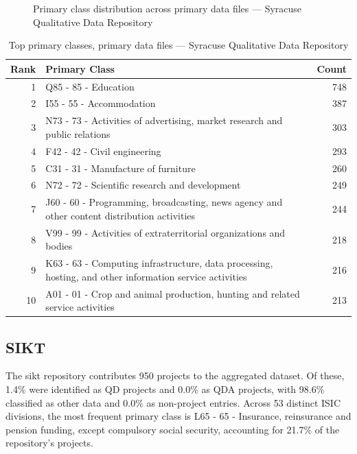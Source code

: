 \clearpage

\begin{figure}[H]
    \centering
    
    \caption{Primary class distribution across primary data files --- Syracuse Qualitative Data Repository}
\end{figure}

\begin{table}[H]
    \centering
    \begin{tabular}{r p{10cm} r}
    \hline
    \textbf{Rank} & \textbf{Primary Class} & \textbf{Count} \\
    \hline
    1 & Q85 - 85 - Education & 748 \\
    2 & I55 - 55 - Accommodation & 387 \\
    3 & N73 - 73 - Activities of advertising, market research and public relations & 303 \\
    4 & F42 - 42 - Civil engineering & 293 \\
    5 & C31 - 31 - Manufacture of furniture & 260 \\
    6 & N72 - 72 - Scientific research and development & 249 \\
    7 & J60 - 60 - Programming, broadcasting, news agency and other content distribution activities & 244 \\
    8 & V99 - 99 - Activities of extraterritorial organizations and bodies & 218 \\
    9 & K63 - 63 - Computing infrastructure, data processing, hosting, and other information service activities & 216 \\
    10 & A01 - 01 - Crop and animal production, hunting and related service activities & 213 \\
    \hline
    \end{tabular}
    \caption{Top primary classes, primary data files --- Syracuse Qualitative Data Repository}
\end{table}

\clearpage

\subsection{SIKT}


The sikt repository contributes 950 projects to the aggregated dataset. Of these, 1.4\% were identified as QD projects and 0.0\% as QDA projects, with 98.6\% classified as other data and 0.0\% as non-project entries. Across 53 distinct ISIC divisions, the most frequent primary class is L65 - 65 - Insurance, reinsurance and pension funding, except compulsory social security, accounting for 21.7\% of the repository's projects.


